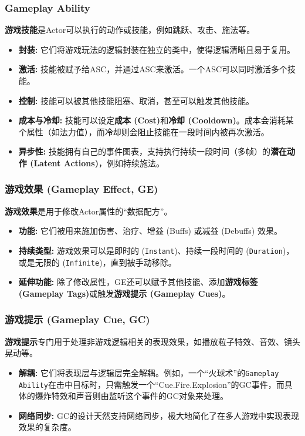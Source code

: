 \documentclass[10pt,CJKmath]{zhbook-v1}
\newcommand{\il}[1]{\texttt{#1}}%
\begin{document}
\subsubsection{Gameplay Ability}
\textbf{游戏技能}是Actor可以执行的动作或技能，例如跳跃、攻击、施法等。
\begin{itemize}
    \item \textbf{封装:} 它们将游戏玩法的逻辑封装在独立的类中，使得逻辑清晰且易于复用。
    \item \textbf{激活:} 技能被赋予给ASC，并通过ASC来激活。一个ASC可以同时激活多个技能。
    \item \textbf{控制:} 技能可以被其他技能阻塞、取消，甚至可以触发其他技能。
    \item \textbf{成本与冷却:} 技能可以设定\textbf{成本 (Cost)}和\textbf{冷却 (Cooldown)}。成本会消耗某个属性（如法力值），而冷却则会阻止技能在一段时间内被再次激活。
    \item \textbf{异步性:} 技能拥有自己的事件图表，支持执行持续一段时间（多帧）的\textbf{潜在动作 (Latent Actions)}，例如持续施法。
\end{itemize}

\subsubsection{游戏效果 (Gameplay Effect, GE)}
\textbf{游戏效果}是用于修改Actor属性的“数据配方”。
\begin{itemize}
    \item \textbf{功能:} 它们被用来施加伤害、治疗、增益 (Buffs) 或减益 (Debuffs) 效果。
    \item \textbf{持续类型:} 游戏效果可以是即时的 (\il{Instant})、持续一段时间的 (\il{Duration})，或是无限的 (\il{Infinite})，直到被手动移除。
    \item \textbf{延伸功能:} 除了修改属性，GE还可以赋予其他技能、添加\textbf{游戏标签 (Gameplay Tags)}或触发\textbf{游戏提示 (Gameplay Cues)}。
\end{itemize}

\subsubsection{游戏提示 (Gameplay Cue, GC)}
\textbf{游戏提示}专门用于处理非游戏逻辑相关的表现效果，如播放粒子特效、音效、镜头晃动等。
\begin{itemize}
    \item \textbf{解耦:} 它们将表现层与逻辑层完全解耦。例如，一个“火球术”的\texttt{Gameplay Ability}在击中目标时，只需触发一个“Cue.Fire.Explosion”的GC事件，而具体的爆炸特效和声音则由监听这个事件的GC对象来处理。
    \item \textbf{网络同步:} GC的设计天然支持网络同步，极大地简化了在多人游戏中实现表现效果的复杂度。
\end{itemize}
\end{document}

